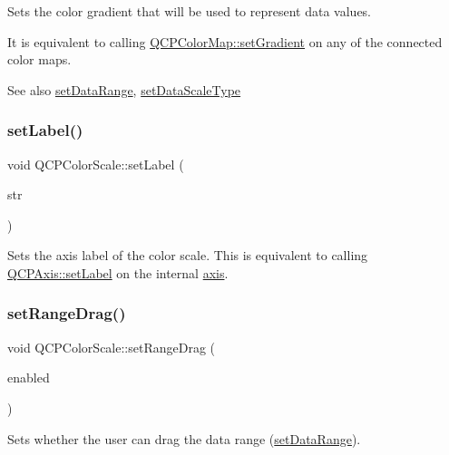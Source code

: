 Sets the color gradient that will be used to represent data values.

It is equivalent to calling \hyperlink{classQCPColorMap_a7313c78360471cead3576341a2c50377}{Q\+C\+P\+Color\+Map\+::set\+Gradient} on any of the connected color maps.

\begin{DoxySeeAlso}{See also}
\hyperlink{classQCPColorScale_abe88633003a26d1e756aa74984587fef}{set\+Data\+Range}, \hyperlink{classQCPColorScale_aeb6107d67dd7325145b2498abae67fc3}{set\+Data\+Scale\+Type} 
\end{DoxySeeAlso}
\mbox{\label{classQCPColorScale_aee124ae8396320cacf8276e9a0fbb8ce}} 
\subsubsection{\texorpdfstring{set\+Label()}{setLabel()}}
{\footnotesize\ttfamily void Q\+C\+P\+Color\+Scale\+::set\+Label (\begin{DoxyParamCaption}\item[{const Q\+String \&}]{str }\end{DoxyParamCaption})}

Sets the axis label of the color scale. This is equivalent to calling \hyperlink{classQCPAxis_a33bcc382c111c9f31bb0687352a2dea4}{Q\+C\+P\+Axis\+::set\+Label} on the internal \hyperlink{classQCPColorScale_a39bdbdb3b212602a5a57f9f3ea444190}{axis}. \mbox{\label{classQCPColorScale_a21c51a55e4fd581b6feadca9ee5b38d5}} 
\subsubsection{\texorpdfstring{set\+Range\+Drag()}{setRangeDrag()}}
{\footnotesize\ttfamily void Q\+C\+P\+Color\+Scale\+::set\+Range\+Drag (\begin{DoxyParamCaption}\item[{bool}]{enabled }\end{DoxyParamCaption})}

Sets whether the user can drag the data range (\hyperlink{classQCPColorScale_abe88633003a26d1e756aa74984587fef}{set\+Data\+Range}).

